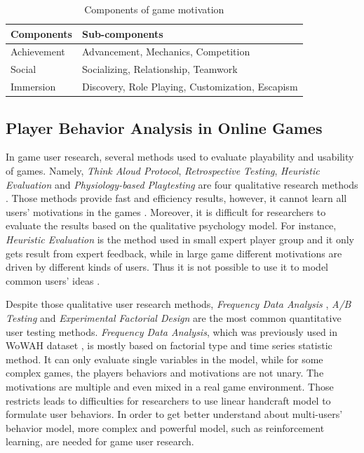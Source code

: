 \documentclass{sigchi}
\begin{document}
\begin{table}
\caption{Components of game motivation}
\begin{tabularx}{\textwidth}{lX}
    Components & Sub-components \\
    \midrule
    Achievement & Advancement, Mechanics, Competition \\
    Social & Socializing, Relationship, Teamwork \\
    Immersion & Discovery, Role Playing, Customization, Escapism
    \label{tbl:components}
\end{tabularx}
\end{table}

\subsection{Player Behavior Analysis in Online Games}

In game user research, several methods used to evaluate playability and usability of games.
Namely, \textit{Think Aloud Protocol}, \textit{Retrospective Testing}, \textit{Heuristic Evaluation} \cite{pinelle2008heuristic} and \textit{Physiology-based Playtesting} \cite{mirza2011understanding} are four qualitative research methods \cite{desurvire2013methods}.
Those methods provide fast and efficiency results, however, it cannot learn all users' motivations in the games \cite{kivikangas2011review}. 
Moreover, it is difficult for researchers to evaluate the results based on the qualitative psychology model. 
For instance, \textit{Heuristic Evaluation} is the method used in small expert player group and it only gets result from expert feedback, while in large game different motivations are driven by different kinds of users. 
Thus it is not possible to use it to model common users' ideas \cite{desurvire2013methods}.

Despite those qualitative user research methods, \textit{Frequency Data Analysis} \cite{el2013game}, \textit{A/B Testing} \cite{lange2009initial} and \textit{Experimental Factorial Design} \cite{ebner2007successful} are the most common quantitative user testing methods.
\textit{Frequency Data Analysis}, which was previously used in WoWAH dataset \cite{Bell2013a}, is mostly based on factorial type and time series statistic method. 
It can only evaluate single variables in the model, while for some complex games, the players behaviors and motivations are not unary. 
The motivations are multiple and even mixed in a real game environment. 
Those restricts leads to difficulties for researchers to use linear handcraft model to formulate user behaviors. 
In order to get better understand about multi-users' behavior model, more complex and powerful model, such as reinforcement learning, are needed for game user research.
\end{document}
